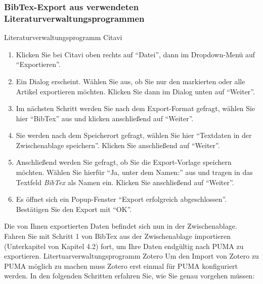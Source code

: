 \documentclass[a4paper,11pt,twoside]{scrbook}
\begin{document}
\subsubsection{BibTex-Export aus verwendeten Literaturverwaltungsprogrammen}
Literaturverwaltungsprogramm Citavi %
\begin{enumerate}
    \item Klicken Sie bei Citavi oben rechts auf \enquote{Datei}, dann im Dropdown-Menü auf \enquote{Exportieren}.
    \item Ein Dialog erscheint. Wählen Sie aus, ob Sie nur den markierten oder alle Artikel exportieren möchten. Klicken Sie dann im Dialog unten auf \enquote{Weiter}.
    \item Im nächsten Schritt werden Sie nach dem Export-Format gefragt, wählen Sie hier \enquote{BibTex}%
     aus und klicken anschließend auf \enquote{Weiter}.
    \item Sie werden nach dem Speicherort gefragt, wählen Sie hier \enquote{Textdaten in der Zwischenablage speichern}. Klicken Sie anschließend auf \enquote{Weiter}.
    \item Anschließend werden Sie gefragt, ob Sie die Export-Vorlage speichern möchten. Wählen Sie hierfür \enquote{Ja, unter dem Namen:} aus und tragen in das Textfeld \textit{BibTex} als Namen ein. Klicken Sie anschließend auf \enquote{Weiter}.%
    \item Es öffnet sich ein Popup-Fenster \enquote{Export erfolgreich abgeschlossen}. Bestätigen Sie den Export mit \enquote{OK}.
\end{enumerate}
Die von Ihnen exportierten Daten befindet sich nun in der Zwischenablage. Fahren Sie mit Schritt 1 von BibTex aus der Zwischenablage importieren (Unterkapitel von Kapitel 4.2) fort, um Ihre Daten endgültig nach PUMA zu exportieren.\newline
\newline
Litertuarverwaltungsprogramm Zotero
\newline \newline
Um den Import von Zotero zu PUMA möglich zu machen muss Zotero erst einmal für PUMA konfiguriert werden. In den folgenden Schritten erfahren Sie, wie Sie genau vorgehen müssen:
\end{document}
